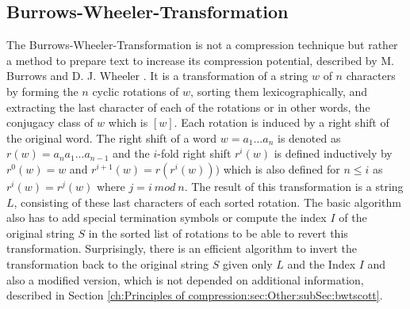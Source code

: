 \subsection{Burrows-Wheeler-Transformation}
\label{ch:Principles of compression:sec:Other:subSec:bwt}

\par{
The Burrows-Wheeler-Transformation is not a compression technique but rather a method to prepare text to increase its compression potential, described by M. Burrows and D. J. Wheeler \cite{Burrows94}. It is a transformation of a string $w$ of $n$ characters by forming the $n$ cyclic rotations of $w$, sorting them lexicographically, and extracting the last character of each of the rotations or in other words, the conjugacy class of $w$ which is $[w]$. Each rotation is induced by a right shift of the original word. The right shift of a word $w=a_1 ... a_n$ is denoted as $r(w) = a_na_1...a_{n-1}$ and the $i$-fold right shift $r^i(w)$ is defined inductively by $r^0(w) = w$ and $r^{i+1}(w) = r(r^i(w))) $ which is also defined for $n \leq i$ as $r^i(w)=r^j(w)$ where $j = i \: mod \: n$. The result of this transformation is a string $L$, consisting of these last characters of each sorted rotation. The basic algorithm also has to add special termination symbols or compute the index $I$ of the original string $S$ in the sorted list of rotations to be able to revert this transformation. Surprisingly, there is an efficient algorithm to invert the transformation back to the original string $S$ given only $L$ and the Index $I$ \cite{Burrows-linear-time} and also a modified version, which is not depended on additional information, described in Section \ref{ch:Principles of compression:sec:Other:subSec:bwtscott}.
}

